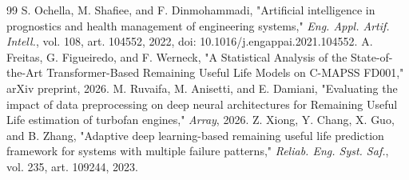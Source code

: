 \documentclass[preprint,10pt]{elsarticle}
\begin{document}
\begin{thebibliography}{99}
  S. Ochella, M. Shafiee, and F. Dinmohammadi, "Artificial intelligence in prognostics and health management of engineering systems," \textit{Eng. Appl. Artif. Intell.}, vol. 108, art. 104552, 2022, doi: 10.1016/j.engappai.2021.104552.
  A. Freitas, G. Figueiredo, and F. Werneck, "A Statistical Analysis of the State-of-the-Art Transformer-Based Remaining Useful Life Models on C-MAPSS FD001," arXiv preprint, 2026.
  M. Ruvaifa, M. Anisetti, and E. Damiani, "Evaluating the impact of data preprocessing on deep neural architectures for Remaining Useful Life estimation of turbofan engines," \textit{Array}, 2026.
  Z. Xiong, Y. Chang, X. Guo, and B. Zhang, "Adaptive deep learning-based remaining useful life prediction framework for systems with multiple failure patterns," \textit{Reliab. Eng. Syst. Saf.}, vol. 235, art. 109244, 2023.
\end{thebibliography}
\end{document}
